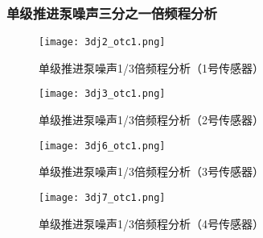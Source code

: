\subsubsection{单级推进泵噪声三分之一倍频程分析}
\begin{figure}[htbp]
    \centering
    \texttt{[image: 3dj2\_otc1.png]}
    \caption{\label{fig:djotc1}单级推进泵噪声1/3倍频程分析（1号传感器）}
\end{figure}
\begin{figure}[htbp]
    \centering
    \texttt{[image: 3dj3\_otc1.png]}
    \caption{\label{fig:djotc2}单级推进泵噪声1/3倍频程分析（2号传感器）}
\end{figure}
\begin{figure}[htbp]
    \centering
    \texttt{[image: 3dj6\_otc1.png]}
    \caption{\label{fig:djotc3}单级推进泵噪声1/3倍频程分析（3号传感器）}
\end{figure}
\begin{figure}[htbp]
    \centering
    \texttt{[image: 3dj7\_otc1.png]}
    \caption{\label{fig:djotc4}单级推进泵噪声1/3倍频程分析（4号传感器）}
\end{figure}

